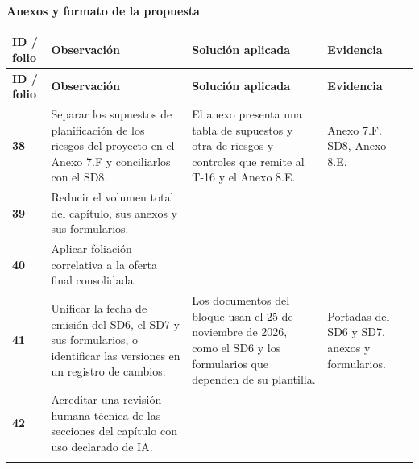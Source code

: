 \documentclass[11pt,letterpaper]{article}
\makeatletter
\newcommand{\tema}[1]{\par{\Large\bfseries #1}\par}
\newcommand{\cabecera}{\rowcolor{fondo}
  \textbf{ID / folio} & \textbf{Observación} & \textbf{Solución aplicada} & \textbf{Evidencia}\\}
\newenvironment{matriz}{%
  \fontsize{10}{13}\selectfont
  \begin{longtable}{@{}>{\RaggedRight\arraybackslash}p{.099\linewidth}
                      >{\RaggedRight\arraybackslash}p{.360\linewidth}
                      >{\RaggedRight\arraybackslash}p{.329\linewidth}
                      >{\RaggedRight\arraybackslash}p{.152\linewidth}@{}}
    \cabecera\endfirsthead
    \cabecera\endhead
}{\end{longtable}\normalsize}
\newcommand{\observacion}[5]{%
  \rule{0pt}{2.3ex}\textbf{#1}\newline {\footnotesize #2} &
  #3 & #4 & #5 \\[2pt]\arrayrulecolor{regla}\midrule}
\makeatother
\begin{document}
\newpage
\tema{Anexos y formato de la propuesta}
\begin{matriz}
\observacion{38}{33}
{Separar los supuestos de planificación de los riesgos del proyecto en el Anexo 7.F y conciliarlos con el SD8.}
{El anexo presenta una tabla de supuestos y otra de riesgos y controles que remite al T-16 y el Anexo 8.E.}
{Anexo 7.F. SD8, Anexo 8.E.}
\observacion{39}{32}
{Reducir el volumen total del capítulo, sus anexos y sus formularios.}{}{}
\observacion{40}{2, 32, 54}
{Aplicar foliación correlativa a la oferta final consolidada.}{}{}
\observacion{41}{26}
{Unificar la fecha de emisión del SD6, el SD7 y sus formularios, o identificar las versiones en un registro de cambios.}
{Los documentos del bloque usan el 25 de noviembre de 2026, como el SD6 y los formularios que dependen de su plantilla.}
{Portadas del SD6 y SD7, anexos y formularios.}
\observacion{42}{2, 54}
{Acreditar una revisión humana técnica de las secciones del capítulo con uso declarado de IA.}{}{}
\end{matriz}
\end{document}

